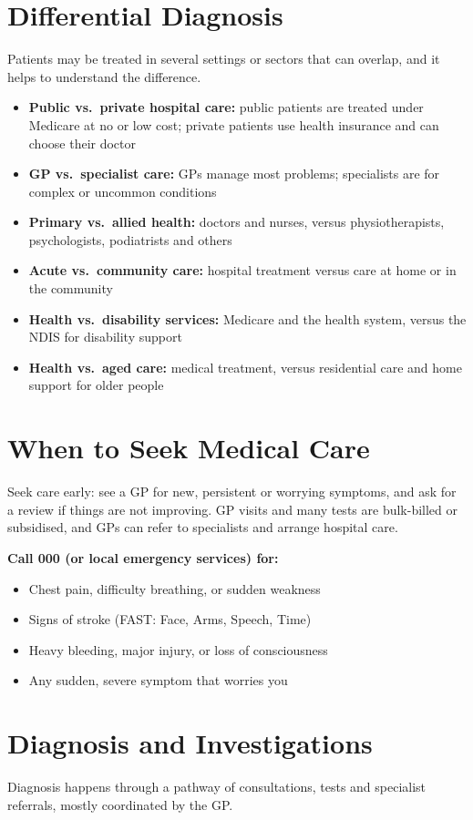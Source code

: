 \section*{Differential Diagnosis}
Patients may be treated in several settings or sectors that can overlap, and it helps to understand the difference.

\begin{itemize}
    \item \textbf{Public vs.\ private hospital care:} public patients are treated under Medicare at no or low cost; private patients use health insurance and can choose their doctor
    \item \textbf{GP vs.\ specialist care:} GPs manage most problems; specialists are for complex or uncommon conditions
    \item \textbf{Primary vs.\ allied health:} doctors and nurses, versus physiotherapists, psychologists, podiatrists and others
    \item \textbf{Acute vs.\ community care:} hospital treatment versus care at home or in the community
    \item \textbf{Health vs.\ disability services:} Medicare and the health system, versus the NDIS for disability support
    \item \textbf{Health vs.\ aged care:} medical treatment, versus residential care and home support for older people
\end{itemize}

\section*{When to Seek Medical Care}
Seek care early: see a GP for new, persistent or worrying symptoms, and ask for a review if things are not improving. GP visits and many tests are bulk-billed or subsidised, and GPs can refer to specialists and arrange hospital care.

\textbf{Call 000 (or local emergency services) for:}
\begin{itemize}
    \item Chest pain, difficulty breathing, or sudden weakness
    \item Signs of stroke (FAST: Face, Arms, Speech, Time)
    \item Heavy bleeding, major injury, or loss of consciousness
    \item Any sudden, severe symptom that worries you
\end{itemize}

\section*{Diagnosis and Investigations}
Diagnosis happens through a pathway of consultations, tests and specialist referrals, mostly coordinated by the GP.

